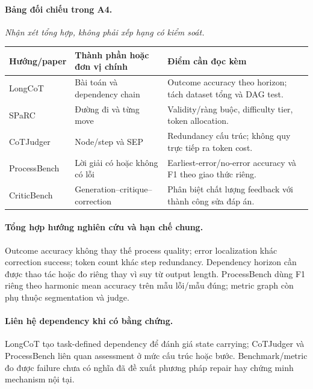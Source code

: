 \begin{samepage}
\paragraph{Bảng đối chiếu trong A4.}
\noindent\textit{Nhận xét tổng hợp, không phải xếp hạng có kiểm soát.}
\begin{center}\small
\begin{tabularx}{\textwidth}{>{\raggedright\arraybackslash}p{2.7cm}>{\raggedright\arraybackslash}X>{\raggedright\arraybackslash}X}
\toprule
\textbf{Hướng/paper} & \textbf{Thành phần hoặc đơn vị chính} & \textbf{Điểm cần đọc kèm} \\
\midrule
LongCoT & Bài toán và dependency chain & Outcome accuracy theo horizon; tách dataset tổng và DAG test. \\
SPaRC & Đường đi và từng move & Validity/ràng buộc, difficulty tier, token allocation. \\
CoTJudger & Node/step và SEP & Redundancy cấu trúc; không quy trực tiếp ra token cost. \\
ProcessBench & Lời giải có hoặc không có lỗi & Earliest-error/no-error accuracy và F1 theo giao thức riêng. \\
CriticBench & Generation–critique–correction & Phân biệt chất lượng feedback với thành công sửa đáp án. \\
\bottomrule
\end{tabularx}
\end{center}
\end{samepage}
\paragraph{Tổng hợp hướng nghiên cứu và hạn chế chung.}
Outcome accuracy không thay thế process quality; error localization khác correction success; token count khác step redundancy. Dependency horizon cần được thao tác hoặc đo riêng thay vì suy từ output length. ProcessBench dùng F1 riêng theo harmonic mean accuracy trên mẫu lỗi/mẫu đúng; metric graph còn phụ thuộc segmentation và judge.

\paragraph{Liên hệ dependency khi có bằng chứng.}
LongCoT tạo task-defined dependency để đánh giá state carrying; CoTJudger và ProcessBench liên quan assessment ở mức cấu trúc hoặc bước. Benchmark/metric đo được failure chưa có nghĩa đã đề xuất phương pháp repair hay chứng minh mechanism nội tại.

